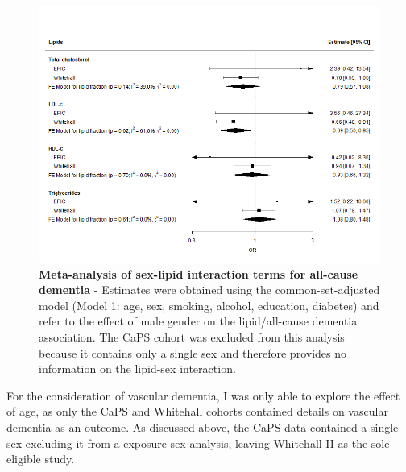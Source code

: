 \documentclass[a4paper, twoside]{templates/ociamthesis}
\begin{document}
\begin{figure}[H]
\includegraphics[width=1\linewidth]{figures/ipd/interaction_sex_dementia} \caption[Meta-analysis of sex-lipid interaction terms for all-cause dementia]{\textbf{Meta-analysis of sex-lipid interaction terms for all-cause dementia} - Estimates were obtained using the common-set-adjusted model (Model 1: age, sex, smoking, alcohol, education, diabetes) and refer to the effect of male gender on the lipid/all-cause dementia association. The CaPS cohort was excluded from this analysis because it contains only a single sex and therefore provides no information on the lipid-sex interaction.}\label{fig:interactionDementiaSex}
\end{figure}

For the consideration of vascular dementia, I was only able to explore the effect of age, as only the CaPS and Whitehall cohorts contained details on vascular dementia as an outcome. As discussed above, the CaPS data contained a single sex excluding it from a exposure-sex analysis, leaving Whitehall II as the sole eligible study.
\end{document}
